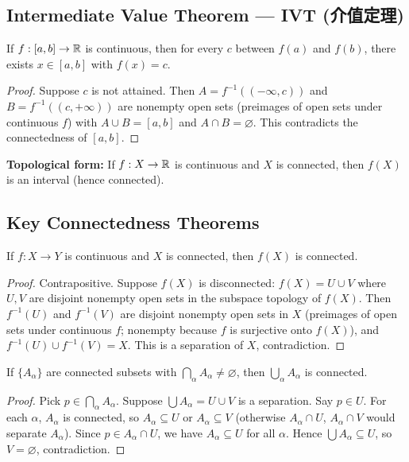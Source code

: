 \documentclass{article}
\begin{document}
\subsection{Intermediate Value Theorem --- IVT (介值定理)}\label{def:ivt}
\begin{theorem}
  If $f : [a, b] \to \mathbb{R}$ is continuous, then for every $c$ between
  $f(a)$ and $f(b)$, there exists $x \in [a, b]$ with $f(x) = c$.
\end{theorem}
\begin{proof}
  Suppose $c$ is not attained. Then $A = f^{-1}((-\infty, c))$ and $B
  = f^{-1}((c, +\infty))$ are nonempty open sets (preimages of open
  sets under continuous $f$) with $A \cup B = [a, b]$ and $A \cap B =
  \varnothing$. This contradicts the connectedness of $[a, b]$.
\end{proof}

\textbf{Topological form:} If $f : X \to \mathbb{R}$ is continuous and $X$ is
connected, then $f(X)$ is an interval (hence connected).

\subsection{Key Connectedness Theorems}\label{def:conn-thms}

\begin{theorem}
  If $f : X \to Y$ is continuous and $X$ is connected, then $f(X)$ is connected.
\end{theorem}
\begin{proof}
  Contrapositive. Suppose $f(X)$ is disconnected: $f(X) = U \cup V$
  where $U, V$ are disjoint nonempty open sets in the subspace
  topology of $f(X)$.
  Then $f^{-1}(U)$ and $f^{-1}(V)$ are disjoint nonempty open sets in $X$
  (preimages of open sets under continuous $f$; nonempty because $f$
  is surjective onto $f(X)$),
  and $f^{-1}(U) \cup f^{-1}(V) = X$. This is a separation of $X$,
  contradiction.
\end{proof}

\begin{theorem}
  If $\{A_\alpha\}$ are connected subsets with
  $\bigcap_\alpha A_\alpha \ne \varnothing$, then $\bigcup_\alpha
  A_\alpha$ is connected.
\end{theorem}
\begin{proof}
  Pick $p \in \bigcap_\alpha A_\alpha$. Suppose $\bigcup A_\alpha = U \cup V$
  is a separation. Say $p \in U$. For each $\alpha$, $A_\alpha$ is connected,
  so $A_\alpha \subseteq U$ or $A_\alpha \subseteq V$ (otherwise
    $A_\alpha \cap U$,
  $A_\alpha \cap V$ would separate $A_\alpha$). Since $p \in A_\alpha \cap U$,
  we have $A_\alpha \subseteq U$ for all $\alpha$. Hence $\bigcup
  A_\alpha \subseteq U$,
  so $V = \varnothing$, contradiction.
\end{proof}
\end{document}
